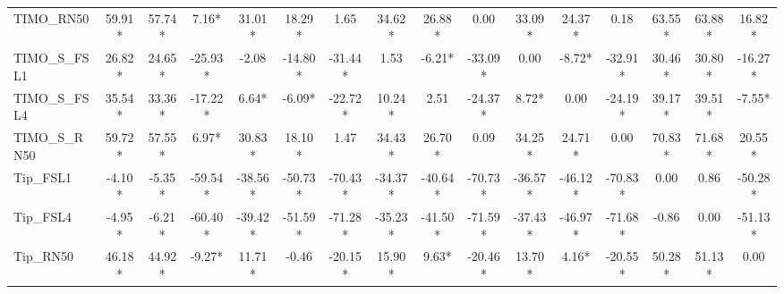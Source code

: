 \documentclass[conference,6pt]{IEEEtran}
\begin{document}
\begin{table}[H]
{\begin{tabular}{@{}l*{15}{c}@{}}
TIMO\_RN50 & 59.91* & 57.74* & 7.16* & 31.01* & 18.29* & 1.65 & 34.62* & 26.88* & 0.00 & 33.09* & 24.37* & 0.18 & 63.55* & 63.88* & 16.82* \\
TIMO\_S\_FSL1 & 26.82* & 24.65* & -25.93* & -2.08 & -14.80* & -31.44* & 1.53 & -6.21* & -33.09* & 0.00 & -8.72* & -32.91* & 30.46* & 30.80* & -16.27* \\
TIMO\_S\_FSL4 & 35.54* & 33.36* & -17.22* & 6.64* & -6.09* & -22.72* & 10.24* & 2.51 & -24.37* & 8.72* & 0.00 & -24.19* & 39.17* & 39.51* & -7.55* \\
TIMO\_S\_RN50 & 59.72* & 57.55* & 6.97* & 30.83* & 18.10* & 1.47 & 34.43* & 26.70* & 0.09 & 34.25* & 24.71* & 0.00 & 70.83* & 71.68* & 20.55* \\
Tip\_FSL1 & -4.10* & -5.35* & -59.54* & -38.56* & -50.73* & -70.43* & -34.37* & -40.64* & -70.73* & -36.57* & -46.12* & -70.83* & 0.00 & 0.86 & -50.28* \\
Tip\_FSL4 & -4.95* & -6.21* & -60.40* & -39.42* & -51.59* & -71.28* & -35.23* & -41.50* & -71.59* & -37.43* & -46.97* & -71.68* & -0.86 & 0.00 & -51.13* \\
Tip\_RN50 & 46.18* & 44.92* & -9.27* & 11.71* & -0.46 & -20.15* & 15.90* & 9.63* & -20.46* & 13.70* & 4.16* & -20.55* & 50.28* & 51.13* & 0.00 \\
\bottomrule
\end{tabular}%
}
\end{table}

\FloatBarrier
\end{document}
